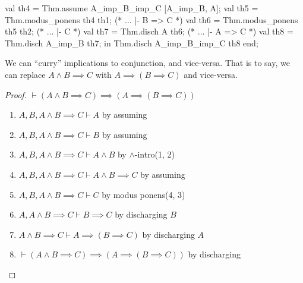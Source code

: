     val th4 = Thm.assume A_imp_B_imp_C [A_imp_B, A];
    val th5 = Thm.modus_ponens th4 th1; (* ... |- B => C *)
    val th6 = Thm.modus_ponens th5 th2; (* ... |- C *)
    val th7 = Thm.disch A th6; (* ... |- A => C *)
    val th8 = Thm.disch A_imp_B th7;
  in
    Thm.disch A_imp_B_imp_C th8
  end;
\eatline
{}\nwendcode{}\nwdocspar
\begin{node}
We can ``curry'' implications to conjunction, and vice-versa. That is
to say, we can replace $A\land B\implies C$ with $A\implies(B\implies C)$
and vice-versa.
\end{node}

\begin{proof}
$\vdash(A\land B\implies C)\implies(A\implies(B\implies C))$
\begin{enumerate}
\item $A,B,A\land B\implies C\vdash A$ by assuming
\item $A,B,A\land B\implies C\vdash B$ by assuming
\item $A,B,A\land B\implies C\vdash A\land B$ by $\land$-intro(1, 2)
\item $A,B,A\land B\implies C\vdash A\land B\implies C$ by assuming
\item $A,B,A\land B\implies C\vdash C$ by modus ponens(4, 3)
\item $A,A\land B\implies C\vdash B\implies C$ by discharging $B$
\item $A\land B\implies C\vdash A\implies(B\implies C)$ by discharging $A$
\item $\vdash(A\land B\implies C)\implies(A\implies(B\implies C))$ by discharging \qedhere
\end{enumerate}
\end{proof}

